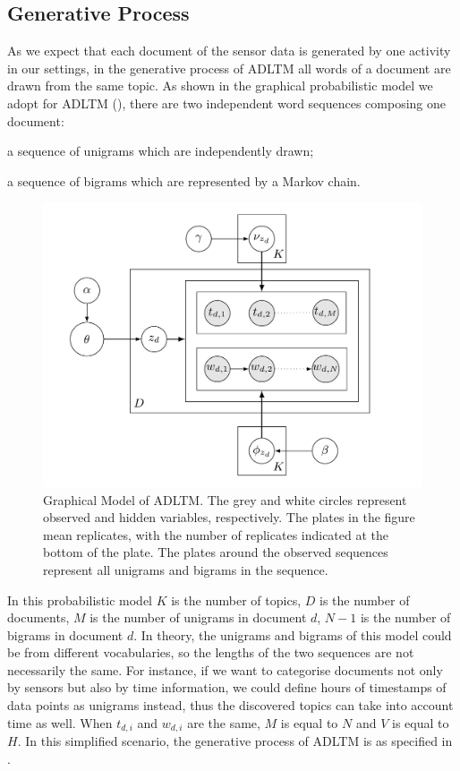 \documentclass{article}
\begin{document}
\subsection{Generative Process}

As we expect that each document of the sensor data is generated by one activity in our settings, in the generative process of \ac{ADLTM} all words of a document are drawn from the same topic.  As shown in the graphical probabilistic model we adopt for \ac{ADLTM} (), there are two independent word sequences composing one document:
\begin{enumerate*}[label=(\roman*)]
    \item a sequence of unigrams which are independently drawn;
    \item a sequence of bigrams which are represented by a Markov chain.
\end{enumerate*}

\begin{figure}[!b]
 \includegraphics[width=\linewidth]{figures/model.pdf}
\caption{Graphical Model of \ac{ADLTM}. The grey and white circles represent observed and hidden variables, respectively. The plates in the figure mean replicates, with the number of replicates indicated at the bottom of the plate. The plates around the observed sequences represent all unigrams and bigrams in the sequence. }
\label{fig:graphical_model}
\end{figure}

In this probabilistic model $K$ is the number of topics, $D$ is the number of documents, $M$ is the number of unigrams in document $d$, $N-1$ is the number of bigrams in document $d$. In theory, the unigrams and bigrams of this model could be from different vocabularies, so the lengths of the two sequences are not necessarily the same. For instance, if we want to categorise documents not only by sensors but also by time information, we could define hours of timestamps of data points as unigrams instead, thus the discovered topics can take into account time as well. When $t_{d,i}$ and $w_{d,i}$ are the same, $M$ is equal to $N$ and $V$ is equal to $H$. In this simplified scenario, the generative process of \ac{ADLTM} is as specified in .
\end{document}
